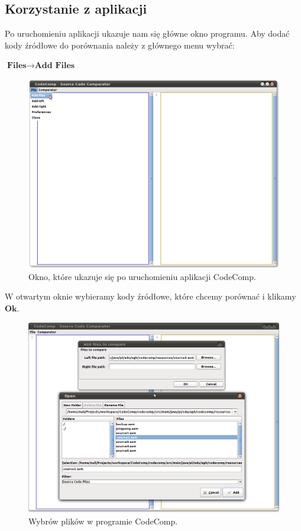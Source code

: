 \documentclass[a4paper,12pt]{article}
\begin{document}
\newpage

\subsection{Korzystanie z aplikacji}

Po uruchomieniu aplikacji ukazuje nam się główne okno programu. Aby dodać kody źródłowe do porównania należy z głównego menu wybrać:

$\textbf{Files} \rightarrow \textbf{Add Files}$
\begin{figure}[here]
\centering
\includegraphics[scale=0.25]{gfx/add_files.png}
\caption{Okno, które ukazuje się po uruchomieniu aplikacji CodeComp.}
\end{figure}

W otwartym oknie wybieramy kody źródłowe, które chcemy porównać i klikamy $\textbf{Ok}$.
\begin{figure}[!]
\centering
\includegraphics[scale=0.25]{gfx/select_files.png}
\caption{Wybrów plików w programie CodeComp.}
\end{figure}
\end{document}
